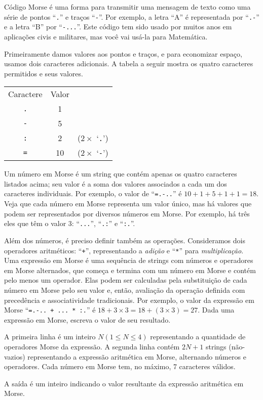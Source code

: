 %
%
%

Código Morse é uma forma para transmitir uma mensagem de texto como uma série de pontos ``\texttt{.}'' e traços ``\texttt{-}''. Por exemplo, a letra ``A'' é representada por ``\texttt{.-}'' e a letra ``B'' por ``\texttt{-...}''. Este código tem sido usado por muitos anos em aplicações civis e militares, mas você vai usá-la para Matemática.

Primeiramente damos valores aos pontos e traços, e para economizar espaço, usamos dois caracteres adicionais. A tabela a seguir mostra os quatro caracteres permitidos e seus valores.

\begin{center}%
	\begin{tabular}{c | c l}%
	Caractere  & Valor & \\\cline{1-2}%
	\texttt{.} & 1     & \\%
	\texttt{-} & 5     & \\%
	\texttt{:} & 2     & ($2\times$ `\texttt{.}')\\%
	\texttt{=} & 10    & ($2\times$ `\texttt{-}')%
	\end{tabular}
\end{center}%

Um número em Morse é um string que contém apenas os quatro caracteres listados acima; seu valor é a soma dos valores associados a cada um dos caracteres individuais. Por exemplo, o valor de \mbox{``\texttt{=.-..}''} é \mbox{$10+1+5+1+1 = 18$}. Veja que cada número em Morse representa um valor único, mas há valores que podem ser representados por diversos números em Morse. Por exemplo, há três eles que têm o valor 3: ``\texttt{...}'', ``\texttt{.:}'' e ``\texttt{:.}''.

Além dos números, é preciso definir também as operações. Consideramos dois operadores aritméticos:  ``\texttt{+}'', representando a \emph{adição} e ``\texttt{*}'' para \emph{multiplicação}. Uma expressão em Morse é uma sequência de strings com números e operadores em Morse alternados, que começa e termina com um número em Morse e contém pelo menos um operador. Elas podem ser calculadas pela substituição de cada número em Morse pelo seu valor e, então, avaliação da operação definida com precedência e associatividade tradicionais. Por exemplo, o valor da expressão em Morse  ``\texttt{=.-.. + ... * :.}'' é \mbox{$18 + 3 \times 3 = 18 + (3 \times 3) = 27$}. Dada uma expressão em Morse, escreva o valor de seu resultado.


\Entrada%
A primeira linha é um inteiro $N (1 \leq N \leq 4)$ representando a quantidade de operadores Morse da expressão. A segunda linha contém $2N + 1$ strings (não-vazios) representando a expressão aritmética em Morse, alternando números e operadores. Cada número em Morse tem, no máximo, 7 caracteres válidos.

\Saida%
A saída é um inteiro indicando o valor resultante da expressão aritmética em Morse.

%

